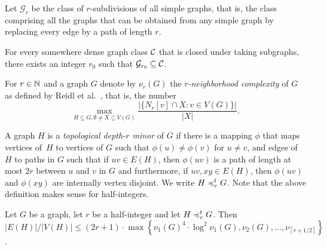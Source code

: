Let $\mathcal{G}_r$ be the class of $r$-subdivisions of all 
simple graphs, that is, the class comprising
all the graphs that can be obtained from any simple graph by replacing every edge by a path of
length $r$.

\begin{lemma}\label{lem:lower-nd}
For every somewhere dense graph class $\mathcal{C}$ that is closed 
under taking subgraphs, there
exists an integer $r_0$ such that $\mathcal{G}_{r_0}\subseteq \mathcal{C}$.
\end{lemma}

For $r\in \mathbb{N}$ and a graph $G$ denote by $\nu_r(G)$ the
\emph{$r$-neighborhood complexity} of $G$ as defined
by Reidl et al.~\cite{reidl2016characterising}, that is, the number 
\[\max_{H\subseteq G,\emptyset\neq X\subseteq V(G)}\frac{|\{N_r[v]\cap X : v\in V(G)\}|}{|X|}.\] 

A graph $H$ is a \emph{topological depth-$r$ minor} of $G$ if
there is a mapping $\phi$ that maps vertices of~$H$ to 
vertices of $G$ such that $\phi(u)\neq \phi(v)$ for 
$u\neq v$, and edges of $H$ to paths in 
$G$ such that if $uv\in E(H)$, then $\phi(uv)$
is a path of length at most $2r$ between $u$ and $v$ in 
$G$ and furthermore, if $uv, xy\in E(H)$, then 
$\phi(uv)$ and $\phi(xy)$ are internally vertex
disjoint. We write $H\preccurlyeq_r^t G$. 
Note that the above definition makes sense for 
half-integers. 

\begin{lemma}\label{lem:lower-be}
Let $G$ be a graph, let $r$ be a half-integer 
and let $H\preccurlyeq_r^tG$. 
Then $|E(H)|/|V(H)|\leq (2r + 1)\cdot \max \left\{\nu_1(G)^4\cdot \log^2\nu_1(G),\nu_2(G),\ldots, \nu_{\left\lceil r+1/2\right\rceil}\right\}$.
\end{lemma}

